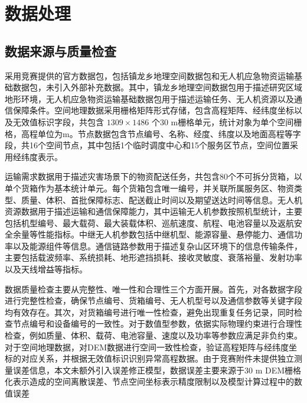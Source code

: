 \section{数据处理}
\subsection{数据来源与质量检查}
{采用竞赛提供的官方数据包，包括镇龙乡地理空间数据包和无人机应急物资运输基础数据包，未引入外部补充数据。其中，镇龙乡地理空间数据包用于描述研究区域地形环境，无人机应急物资运输基础数据包用于描述运输任务、无人机资源以及通信保障条件。空间地理数据采用栅格矩阵形式存储，包含高程矩阵、经纬度坐标以及无效值标识字段，共包含 $1309\times1486$ 个30 m栅格单元，统计对象为单个空间栅格，高程单位为m。节点数据包含节点编号、名称、经度、纬度以及地面高程等字段，共16个空间节点，其中包括1个临时调度中心和15个服务区节点，空间位置采用经纬度表示。
	
	运输需求数据用于描述灾害场景下的物资配送任务，共包含80个不可拆分货箱，以单个货箱作为基本统计单元。每个货箱包含唯一编号，并关联所属服务区、物资类型、质量、体积、首批保障标志、配送截止时间以及期望送达时间等信息。无人机资源数据用于描述运输和通信保障能力，其中运输无人机参数按照机型统计，主要包括机型编号、最大载荷、最大装载体积、巡航速度、航程、电池容量以及返航安全余量等性能指标。中继无人机参数包括中继机型、能源容量、悬停能力、通信功率以及能源组件等信息。通信链路参数用于描述复杂山区环境下的信息传输条件，主要包括载波频率、系统损耗、地形遮挡损耗、接收灵敏度、衰落裕量、发射功率以及天线增益等指标。
	
	数据质量检查主要从完整性、唯一性和合理性三个方面开展。首先，对各数据字段进行完整性检查，确保节点编号、货箱编号、无人机型号以及通信参数等关键字段均有效存在。其次，对货箱编号进行唯一性检查，避免出现重复任务记录，同时检查节点编号和设备编号的一致性。对于数值型参数，依据实际物理约束进行合理性检查，例如质量、体积、载荷、电池容量、速度以及功率等参数应满足非负约束。对于空间地理数据，对DEM数据进行空间一致性检查，验证高程矩阵与经纬度坐标的对应关系，并根据无效值标识识别异常高程数据。由于竞赛附件未提供独立测量误差信息，本文未额外引入误差修正模型，数据误差主要来源于30 m DEM栅格化表示造成的空间离散误差、节点空间坐标表示精度限制以及模型计算过程中的数值误差}
